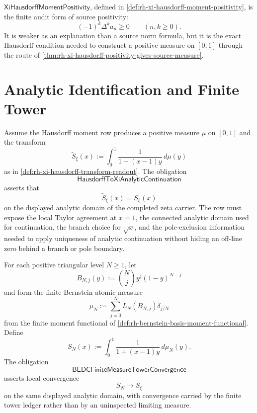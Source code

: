 \begin{principle}
\label{prin:rh-xi-hausdorff-frontier-role}
$\mathsf{XiHausdorffMomentPositivity}$, defined in
\autoref{def:rh-xi-hausdorff-moment-positivity}, is the finite audit
form of source positivity:
$$
(-1)^k\Delta^k a_n\ge0
\qquad
(n,k\ge0).
$$
It is weaker as an explanation than a source norm formula, but it is the
exact Hausdorff condition needed to construct a positive measure on
$[0,1]$ through the route of
\autoref{thm:rh-xi-hausdorff-positivity-gives-source-measure}.
\end{principle}

\section{Analytic Identification and Finite Tower}
\label{sec:rh-source-positive-analytic-tower}

\begin{definition}[HausdorffToXiAnalyticContinuation]
\label{def:rh-hausdorff-to-xi-analytic-continuation}
Assume the Hausdorff moment row produces a positive measure $\mu$ on
$[0,1]$ and the transform
$$
\widetilde S_{\xi}(x)
:=
\int_0^1
\frac{1}{1+(x-1)y}
\,d\mu(y)
$$
as in \autoref{def:rh-xi-hausdorff-transform-readout}. The obligation
$$
\mathsf{HausdorffToXiAnalyticContinuation}
$$
asserts that
$$
\widetilde S_{\xi}(x)=S_{\xi}(x)
$$
on the displayed analytic domain of the completed zeta carrier. The row
must expose the local Taylor agreement at $x=1$, the connected analytic
domain used for continuation, the branch choice for $\sqrt{x}$, and the
pole-exclusion information needed to apply uniqueness of analytic
continuation without hiding an off-line zero behind a branch or pole
boundary.
\end{definition}

\begin{definition}[BEDCFiniteMeasureTowerConvergence]
\label{def:rh-bedc-finite-measure-tower-convergence}
For each positive triangular level $N\ge1$, let
$$
B_{N,j}(y)
:=
\binom Nj y^j(1-y)^{N-j}
$$
and form the finite Bernstein atomic measure
$$
\mu_N
:=
\sum_{j=0}^{N}
L_N(B_{N,j})\delta_{j/N}
$$
from the finite moment functional of
\autoref{def:rh-bernstein-basis-moment-functional}. Define
$$
S_N(x)
:=
\int_0^1
\frac{1}{1+(x-1)y}
\,d\mu_N(y).
$$
The obligation
$$
\mathsf{BEDCFiniteMeasureTowerConvergence}
$$
asserts local convergence
$$
S_N\to S_{\xi}
$$
on the same displayed analytic domain, with convergence carried by the
finite tower ledger rather than by an uninspected limiting measure.
\end{definition}

